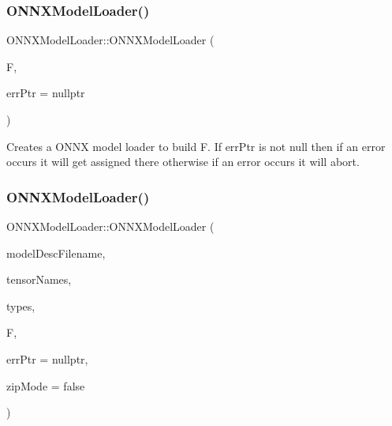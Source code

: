 \subsubsection{\texorpdfstring{O\+N\+N\+X\+Model\+Loader()}{ONNXModelLoader()}\hspace{0.1cm}{\footnotesize\ttfamily [2/3]}}
{\footnotesize\ttfamily O\+N\+N\+X\+Model\+Loader\+::\+O\+N\+N\+X\+Model\+Loader (\begin{DoxyParamCaption}\item[{\hyperlink{classglow_1_1_function}{Function} \&}]{F,  }\item[{\hyperlink{namespaceglow_afdb176c3a672ef66db0ecfc19a8d39bf}{Error} $\ast$}]{err\+Ptr = {\ttfamily nullptr} }\end{DoxyParamCaption})}

Creates a O\+N\+NX model loader to build {\ttfamily F}. If {\ttfamily err\+Ptr} is not null then if an error occurs it will get assigned there otherwise if an error occurs it will abort. \mbox{\label{classglow_1_1_o_n_n_x_model_loader_a610dc94fa573669e30035e80c020f5ab}} 
\subsubsection{\texorpdfstring{O\+N\+N\+X\+Model\+Loader()}{ONNXModelLoader()}\hspace{0.1cm}{\footnotesize\ttfamily [3/3]}}
{\footnotesize\ttfamily O\+N\+N\+X\+Model\+Loader\+::\+O\+N\+N\+X\+Model\+Loader (\begin{DoxyParamCaption}\item[{const std\+::string \&}]{model\+Desc\+Filename,  }\item[{llvm\+::\+Array\+Ref$<$ const char $\ast$$>$}]{tensor\+Names,  }\item[{llvm\+::\+Array\+Ref$<$ \hyperlink{structglow_1_1_type}{Type\+Ref} $>$}]{types,  }\item[{\hyperlink{classglow_1_1_function}{Function} \&}]{F,  }\item[{\hyperlink{namespaceglow_afdb176c3a672ef66db0ecfc19a8d39bf}{Error} $\ast$}]{err\+Ptr = {\ttfamily nullptr},  }\item[{bool}]{zip\+Mode = {\ttfamily false} }\end{DoxyParamCaption})}

